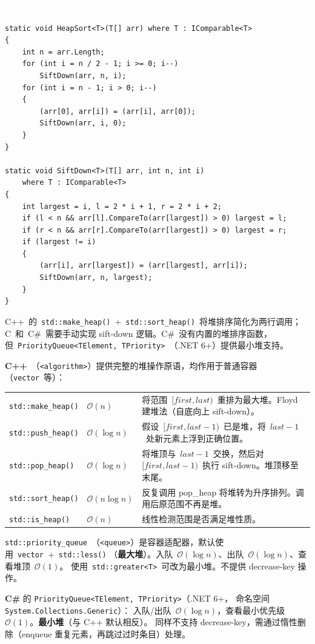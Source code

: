 \documentclass[12pt,a4paper,fontset=fandol]{ctexbook}
\newcommand{\csharplabel}{%
  \noindent\begin{tcolorbox}[sharp corners,colback=csharpheadbg,colframe=csharpheadbg,
    left=6pt,right=6pt,top=2pt,bottom=2pt,boxrule=0pt]
  \textcolor{white}{\small\bfseries\sffamily C\#}\end{tcolorbox}%
}
\newcommand{\bigO}[1]{\mathcal{O}(#1)}
\newcommand{\header}[1]{\texttt{<#1>}}
\newcommand{\Fn}[1]{\texttt{#1()}}
\newcommand{\Tp}[1]{\texttt{#1}}
\begin{document}
\csharplabel
\begin{lstlisting}[style=csharpstyle]
static void HeapSort<T>(T[] arr) where T : IComparable<T>
{
    int n = arr.Length;
    for (int i = n / 2 - 1; i >= 0; i--)
        SiftDown(arr, n, i);
    for (int i = n - 1; i > 0; i--)
    {
        (arr[0], arr[i]) = (arr[i], arr[0]);
        SiftDown(arr, i, 0);
    }
}

static void SiftDown<T>(T[] arr, int n, int i)
    where T : IComparable<T>
{
    int largest = i, l = 2 * i + 1, r = 2 * i + 2;
    if (l < n && arr[l].CompareTo(arr[largest]) > 0) largest = l;
    if (r < n && arr[r].CompareTo(arr[largest]) > 0) largest = r;
    if (largest != i)
    {
        (arr[i], arr[largest]) = (arr[largest], arr[i]);
        SiftDown(arr, n, largest);
    }
}
\end{lstlisting}

\begin{compare}
C++~的~\Fn{std::\allowbreak{}make\_\allowbreak{}heap}~+~\Fn{std::\allowbreak{}sort\_\allowbreak{}heap}~将堆排序简化为两行调用；
C~和~C\#~需要手动实现 sift-down 逻辑。C\#~没有内置的堆排序函数，
但~\Tp{Priority\allowbreak{}Queue<TElement, TPriority>}~（.NET 6+）提供最小堆支持。
\end{compare}

\begin{stdspec}[title=堆操作算法族]
\textbf{C++}~（\header{algorithm}）提供完整的堆操作原语，均作用于普通容器（\Tp{vector}~等）：

\begin{tabularx}{\textwidth}{@{}l l >{\raggedright\arraybackslash}X@{}}
  \Fn{std::make\_heap} & $\bigO{n}$ & 将范围~$[first, last)$~重排为最大堆。Floyd 建堆法（自底向上 sift-down）。 \\
  \Fn{std::push\_heap} & $\bigO{\log n}$ & 假设~$[first, last-1)$~已是堆，将~$last-1$~处新元素上浮到正确位置。 \\
  \Fn{std::pop\_heap} & $\bigO{\log n}$ & 将堆顶与~$last-1$~交换，然后对~$[first, last-1)$~执行 sift-down。堆顶移至末尾。 \\
  \Fn{std::sort\_heap} & $\bigO{n\log n}$ & 反复调用 pop\_heap 将堆转为升序排列。调用后原范围不再是堆。 \\
  \Fn{std::is\_heap} & $\bigO{n}$ & 线性检测范围是否满足堆性质。 \\
\end{tabularx}

\medskip
\Tp{std::priority\_queue}~（\header{queue}）是容器适配器，默认使用~\Tp{vector}~+~\Fn{std::less}
（\textbf{最大堆}）。入队~$\bigO{\log n}$、出队~$\bigO{\log n}$、查看堆顶~$\bigO{1}$。
使用~\Tp{std::greater<T>}~可改为最小堆。不提供 decrease-key 操作。

\medskip\noindent\textbf{C\#} 的 \Tp{Priority\allowbreak{}Queue<TElement, TPriority>}（.NET 6+，
命名空间 \texttt{System.\allowbreak{}Collections.\allowbreak{}Generic}）：
入队/出队~$\bigO{\log n}$，查看最小优先级~$\bigO{1}$。\textbf{最小堆}（与 C++ 默认相反）。
同样不支持 decrease-key，需通过惰性删除（enqueue 重复元素，再跳过过时条目）处理。
\end{stdspec}
\end{document}
